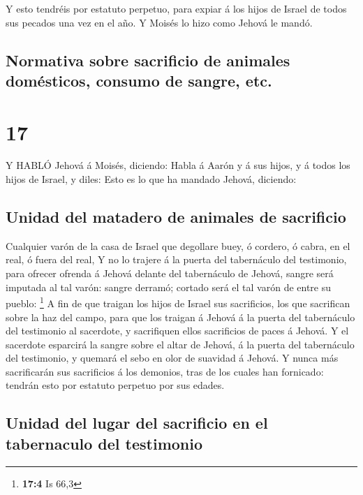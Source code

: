  Y esto tendréis por estatuto perpetuo, para expiar á los
hijos de Israel de todos sus pecados una vez en el año. Y Moisés lo hizo
como Jehová le mandó.

\hypertarget{normativa-sobre-sacrificio-de-animales-domuxe9sticos-consumo-de-sangre-etc.}{%
\subsection{Normativa sobre sacrificio de animales domésticos, consumo
de sangre,
etc.}\label{normativa-sobre-sacrificio-de-animales-domuxe9sticos-consumo-de-sangre-etc.}}

\hypertarget{section-16}{%
\section{17}\label{section-16}}

 Y HABLÓ Jehová á Moisés, diciendo:  Habla á
Aarón y á sus hijos, y á todos los hijos de Israel, y diles: Esto es lo
que ha mandado Jehová, diciendo:

\hypertarget{unidad-del-matadero-de-animales-de-sacrificio}{%
\subsection{Unidad del matadero de animales de
sacrificio}\label{unidad-del-matadero-de-animales-de-sacrificio}}

 Cualquier varón de la casa de Israel que degollare buey, ó
cordero, ó cabra, en el real, ó fuera del real,  Y no lo
trajere á la puerta del tabernáculo del testimonio, para ofrecer ofrenda
á Jehová delante del tabernáculo de Jehová, sangre será imputada al tal
varón: sangre derramó; cortado será el tal varón de entre su pueblo:
\footnote{\textbf{17:4} Is 66,3}  A fin de que traigan los
hijos de Israel sus sacrificios, los que sacrifican sobre la haz del
campo, para que los traigan á Jehová á la puerta del tabernáculo del
testimonio al sacerdote, y sacrifiquen ellos sacrificios de paces á
Jehová.  Y el sacerdote esparcirá la sangre sobre el altar
de Jehová, á la puerta del tabernáculo del testimonio, y quemará el sebo
en olor de suavidad á Jehová.  Y nunca más sacrificarán sus
sacrificios á los demonios, tras de los cuales han fornicado: tendrán
esto por estatuto perpetuo por sus edades.

\hypertarget{unidad-del-lugar-del-sacrificio-en-el-tabernaculo-del-testimonio}{%
\subsection{Unidad del lugar del sacrificio en el tabernaculo del
testimonio}\label{unidad-del-lugar-del-sacrificio-en-el-tabernaculo-del-testimonio}}

